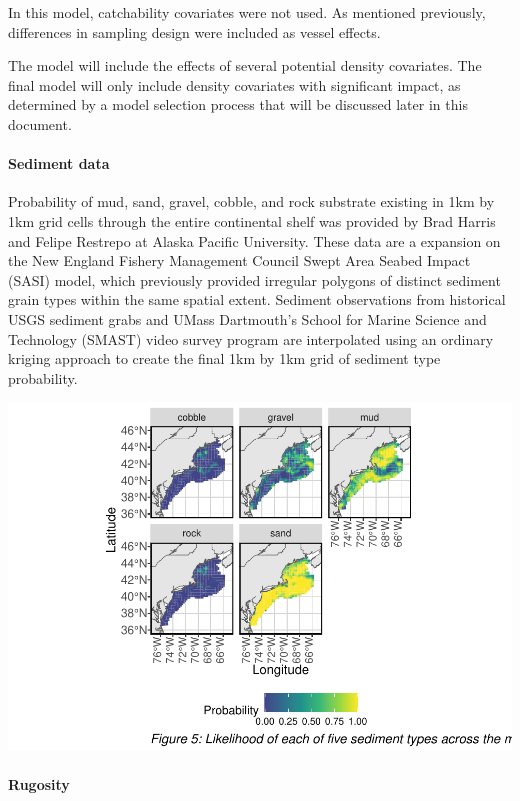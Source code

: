 \documentclass[
]{article}
\begin{document}
In this model, catchability covariates were not used. As mentioned previously, differences in sampling design were included as vessel effects.

The model will include the effects of several potential density covariates. The final model will only include density covariates with significant impact, as determined by a model selection process that will be discussed later in this document.

\hypertarget{sediment-data}{%
\paragraph{Sediment data}\label{sediment-data}}

Probability of mud, sand, gravel, cobble, and rock substrate existing in 1km by 1km grid cells through the entire continental shelf was provided by Brad Harris and Felipe Restrepo at Alaska Pacific University. These data are a expansion on the New England Fishery Management Council Swept Area Seabed Impact (SASI) model, which previously provided irregular polygons of distinct sediment grain types within the same spatial extent. Sediment observations from historical USGS sediment grabs and UMass Dartmouth's School for Marine Science and Technology (SMAST) video survey program are interpolated using an ordinary kriging approach to create the final 1km by 1km grid of sediment type probability.

\includegraphics{ToR1_TechPaper_files/figure-latex/sediment plots-1.pdf}

\hypertarget{rugosity}{%
\paragraph{Rugosity}\label{rugosity}}
\end{document}

